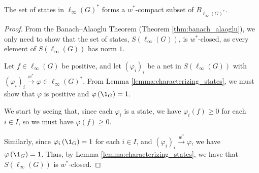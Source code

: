 \begin{corollary}
  The set of states in $\ell_{\infty}\left(G\right)^{\ast}$ forms a $w^{\ast}$-compact subset of $B_{\ell_{\infty}\left(G\right)^{\ast}}$.
\end{corollary}
\begin{proof}
  From the Banach--Alaoglu Theorem (Theorem \ref{thm:banach_alaoglu}), we only need to show that the set of states, $S\left(\ell_{\infty}\left(G\right)\right)$, is $w^{\ast}$-closed, as every element of $S\left(\ell_{\infty}\left(G\right)\right)$ has norm $1$.\newline

  Let $f\in \ell_{\infty}\left(G\right)$ be positive, and let $\left(\varphi_{i}\right)_i$ be a net in $S\left(\ell_{\infty}\left(G\right)\right)$ with $\left(\varphi_{i}\right)_i\xrightarrow{w^{\ast}} \varphi\in \ell_{\infty}\left(G\right)^{\ast}$. From Lemma \ref{lemma:characterizing_states}, we must show that $\varphi$ is positive and $\varphi\left(\1_{G}\right) = 1$.\newline

  We start by seeing that, since each $\varphi_i$ is a state, we have $\varphi_{i}\left(f\right) \geq 0$ for each $i\in I$, so we must have $\varphi\left(f\right) \geq 0$.\newline

  Similarly, since $\varphi_{i}\left(\1_{G}\right) = 1$ for each $i\in I$, and $\left(\varphi_i\right)_i \xrightarrow{w^{\ast}} \varphi$, we have $\varphi\left(\1_{G}\right) = 1$. Thus, by Lemma \ref{lemma:characterizing_states}, we have that $S\left(\ell_{\infty}\left(G\right)\right)$ is $w^{\ast}$-closed.
\end{proof}

